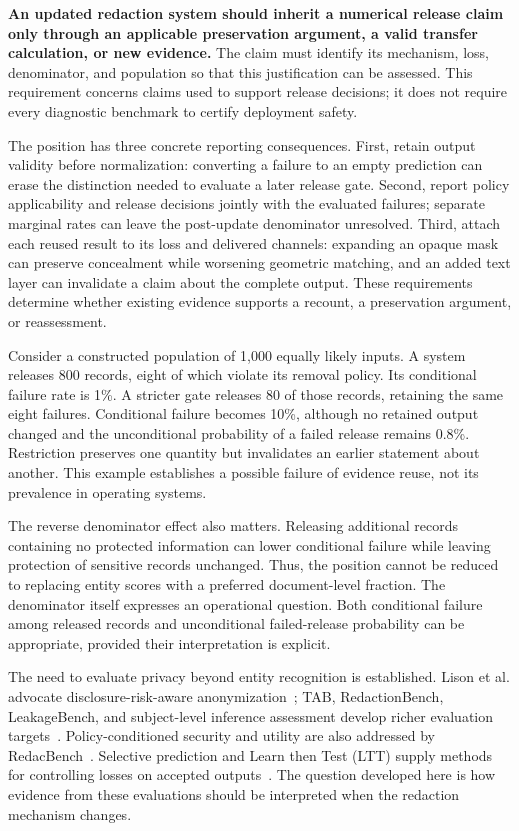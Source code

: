 \documentclass[conference]{IEEEtran}
\begin{document}
\textbf{An updated redaction system should inherit a numerical release claim only through an applicable preservation argument, a valid transfer calculation, or new evidence.} The claim must identify its mechanism, loss, denominator, and population so that this justification can be assessed. This requirement concerns claims used to support release decisions; it does not require every diagnostic benchmark to certify deployment safety.

The position has three concrete reporting consequences. First, retain output validity before normalization: converting a failure to an empty prediction can erase the distinction needed to evaluate a later release gate. Second, report policy applicability and release decisions jointly with the evaluated failures; separate marginal rates can leave the post-update denominator unresolved. Third, attach each reused result to its loss and delivered channels: expanding an opaque mask can preserve concealment while worsening geometric matching, and an added text layer can invalidate a claim about the complete output. These requirements determine whether existing evidence supports a recount, a preservation argument, or reassessment.

Consider a constructed population of 1,000 equally likely inputs. A system releases 800 records, eight of which violate its removal policy. Its conditional failure rate is 1\%. A stricter gate releases 80 of those records, retaining the same eight failures. Conditional failure becomes 10\%, although no retained output changed and the unconditional probability of a failed release remains 0.8\%. Restriction preserves one quantity but invalidates an earlier statement about another. This example establishes a possible failure of evidence reuse, not its prevalence in operating systems.

The reverse denominator effect also matters. Releasing additional records containing no protected information can lower conditional failure while leaving protection of sensitive records unchanged. Thus, the position cannot be reduced to replacing entity scores with a preferred document-level fraction. The denominator itself expresses an operational question. Both conditional failure among released records and unconditional failed-release probability can be appropriate, provided their interpretation is explicit.

The need to evaluate privacy beyond entity recognition is established. Lison et al. advocate disclosure-risk-aware anonymization~\cite{lison2021}; TAB, RedactionBench, LeakageBench, and subject-level inference assessment develop richer evaluation targets~\cite{tab2022,redactionbench2026,leakagebench2026,spia2026}. Policy-conditioned security and utility are also addressed by RedacBench~\cite{redacbench2026}. Selective prediction and Learn then Test (LTT) supply methods for controlling losses on accepted outputs~\cite{elyaniv2010,geifman2017,angelopoulos2025}. The question developed here is how evidence from these evaluations should be interpreted when the redaction mechanism changes.
\end{document}
